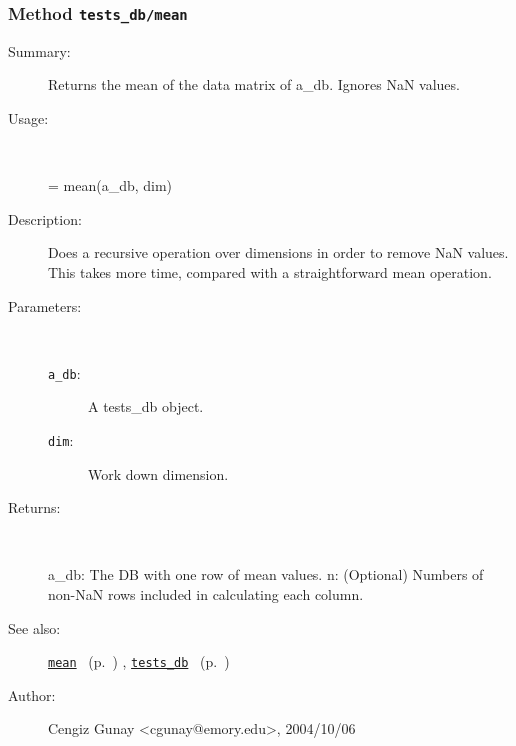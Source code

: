 \subsubsection[Method \texttt{mean}]{Method \texttt{tests\_db/mean}}%
%
\label{ref_tests_db__mean}%
\hypertarget{ref_tests_db__mean}{}%
\begin{description}
\item[Summary:]Returns the mean of the data matrix of a\_db. Ignores NaN values.
%
\item[Usage:]~%
\begin{lyxcode}%
[a\_db, n] = mean(a\_db, dim)
%
\end{lyxcode}%
%
\item[Description:]%
Does a recursive operation over dimensions in order to remove NaN values.
 This takes more time, compared with a straightforward mean operation. 
\item[Parameters:]~
\begin{description}%
\item[\texttt{a\_db}:]
 A tests\_db object.
\item[\texttt{dim}:]
 Work down dimension.
\end{description}%
%
\item[Returns:]~

	a\_db: The DB with one row of mean values.
	n: (Optional) Numbers of non-NaN rows included in calculating each column.
%
%
\item[See also:]%
\hyperlink{ref_mean}{\texttt{mean}}%
\ (p.~\pageref{ref_mean})%
%
, \hyperlink{ref_tests_db}{\texttt{tests\_db}}%
\ (p.~\pageref{ref_tests_db})%
%
%
\item[Author:]%
Cengiz Gunay <cgunay@emory.edu>, 2004/10/06%
\end{description}
\methodline%

